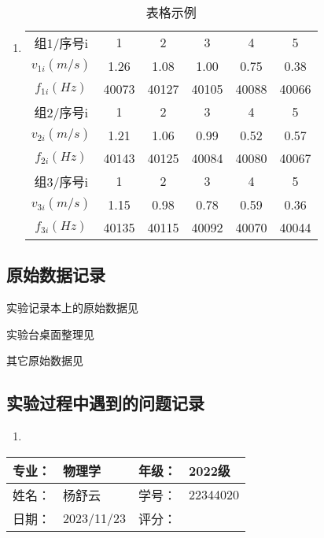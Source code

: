 \documentclass[dvipsnames, svgnames,a4paper,11pt]{article}
\begin{document}
	\subsubsection{}
	\begin{enumerate}
		\item \begin{table}[h]
			\centering
			\caption{表格示例}
			\label{tab:tab1}
			\begin{tabular}{|c|c|c|c|c|c|}
				\hline
				组1/序号i & 1 & 2 & 3 & 4 & 5 \\
				$v_{1i}(m/s)$ & 1.26 & 1.08 & 1.00 & 0.75 & 0.38 \\
				$f_{1i}(Hz)$ & 40073 & 40127 & 40105 & 40088 & 40066 \\
				\hline
				组2/序号i & 1 & 2 & 3 & 4 & 5 \\
				$v_{2i}(m/s)$ & 1.21 & 1.06 & 0.99 & 0.52 & 0.57 \\
				$f_{2i}(Hz)$ & 40143 & 40125 & 40084 & 40080 & 40067 \\
				\hline
				组3/序号i & 1 & 2 & 3 & 4 & 5 \\
				$v_{3i}(m/s)$ & 1.15 & 0.98 & 0.78 & 0.59 & 0.36 \\
				$f_{3i}(Hz)$ & 40135 & 40115 & 40092 & 40070 & 40044 \\
				\hline
			\end{tabular}
		\end{table}		
	\end{enumerate}
	
	
	\clearpage
	\subsection{原始数据记录}
	实验记录本上的原始数据见%
	
	实验台桌面整理见%
	
	其它原始数据见%
	
	\subsection{实验过程中遇到的问题记录}
	\begin{enumerate}
		\item 
	\end{enumerate}
	
	
	
	\clearpage
	
	\begin{table}
		\renewcommand\arraystretch{1.7}
		\begin{tabularx}{\textwidth}{|X|X|X|X|}
			\hline
			专业：& 物理学 &年级：& 2022级\\
			\hline
			姓名： & 杨舒云 & 学号：& 22344020\\
			\hline
			日期：& 2023/11/23 & 评分： &\\
			\hline
		\end{tabularx}
	\end{table}
	
\end{document}
